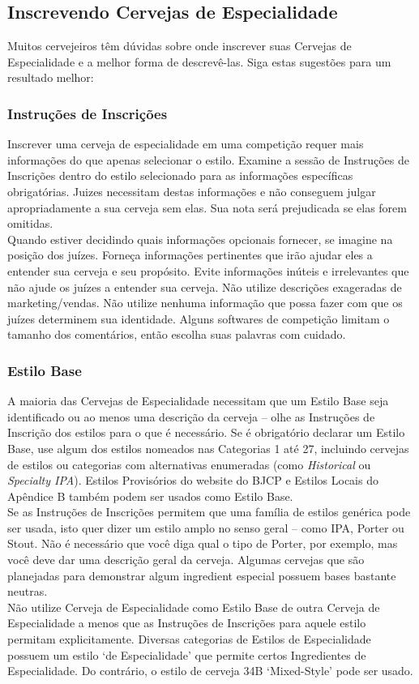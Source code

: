 \subsection*{Inscrevendo Cervejas de Especialidade}
Muitos cervejeiros têm dúvidas sobre onde inscrever suas Cervejas de Especialidade e a melhor forma de descrevê-las. Siga estas sugestões para um resultado melhor:
\subsubsection*{Instruções de Inscrições}
Inscrever uma cerveja de especialidade em uma competição requer mais informações do que apenas selecionar o estilo. Examine a sessão de Instruções de Inscrições dentro do estilo selecionado para as informações específicas obrigatórias. Juizes necessitam destas informações e não conseguem julgar apropriadamente a sua cerveja sem elas. Sua nota será prejudicada se elas forem omitidas.\\
Quando estiver decidindo quais informações opcionais fornecer, se imagine na posição dos juízes. Forneça informações pertinentes que irão ajudar eles a entender sua cerveja e seu propósito. Evite informações inúteis e irrelevantes que não ajude os juízes a entender sua cerveja. Não utilize descrições exageradas de marketing/vendas. Não utilize nenhuma informação que possa fazer com que os juízes determinem sua identidade. Alguns softwares de competição limitam o tamanho dos comentários, então escolha suas palavras com cuidado.

\subsubsection*{Estilo Base}
A maioria das Cervejas de Especialidade necessitam que um Estilo Base seja identificado ou ao menos uma descrição da cerveja – olhe as Instruções de Inscrição dos estilos para o que é necessário. Se é obrigatório declarar um Estilo Base, use algum dos estilos nomeados nas Categorias 1 até 27, incluindo cervejas de estilos ou categorias com alternativas enumeradas (como \textit{Historical} ou \textit{Specialty IPA}). Estilos Provisórios do website do BJCP e Estilos Locais do Apêndice B também podem ser usados como Estilo Base.\\
Se as Instruções de Inscrições permitem que uma família de estilos genérica pode ser usada, isto quer dizer um estilo amplo no senso geral – como IPA, Porter ou Stout. Não é necessário que você diga qual o tipo de Porter, por exemplo, mas você deve dar uma descrição geral da cerveja. Algumas cervejas que são planejadas para demonstrar algum ingredient especial possuem bases bastante neutras.\\
Não utilize Cerveja de Especialidade como Estilo Base de outra Cerveja de Especialidade a menos que as Instruções de Inscrições para aquele estilo permitam explicitamente. Diversas categorias de Estilos de Especialidade possuem um estilo ‘de Especialidade’ que permite certos Ingredientes de Especialidade. Do contrário, o estilo de cerveja 34B ‘Mixed-Style’ pode ser usado.

